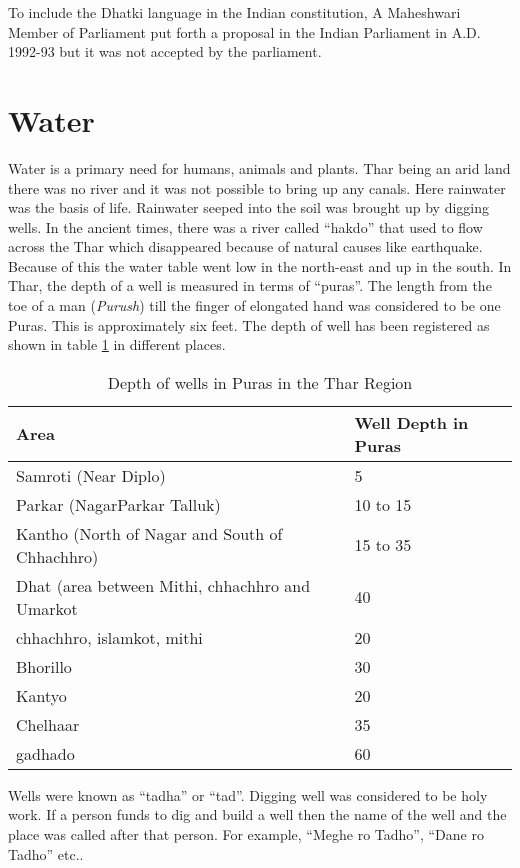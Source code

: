 To include the Dhatki language in the Indian constitution, A Maheshwari Member
of Parliament put forth a proposal in the Indian Parliament in A.D. 1992-93 but
it was not accepted by the parliament.

\section{Water}
Water is a primary need for humans, animals and plants. Thar being an arid land
there was no river and it was not possible to bring up any canals. Here
rainwater was the basis of life. Rainwater seeped into the soil was brought up
by digging wells. In the ancient times, there was a river called ``hakdo'' that
used to flow across the Thar which disappeared because of natural causes like
earthquake. Because of this the water table went low in the north-east and up in
the south. In Thar, the depth of a well is measured in terms of ``puras''. The
length from the toe of a man (\textit{Purush}) till the finger of elongated hand was
considered to be one Puras. This is approximately six feet. The depth of well
has been registered as shown in table \ref{tbl:well} in different places.
\begin{table}
\begin{center}
\begin{tabular}{l|l}
\hline
\textbf{Area} & \textbf{Well Depth in Puras} \\
\hline
Samroti (Near Diplo) & 5 \\ 
Parkar (NagarParkar Talluk) & 10 to 15 \\ 
Kantho (North of Nagar and South of Chhachhro) & 15 to 35 \\ 
Dhat (area between Mithi, chhachhro and Umarkot & 40 \\ 
chhachhro, islamkot, mithi & 20 \\ 
Bhorillo & 30 \\ 
Kantyo & 20 \\ 
Chelhaar & 35 \\ 
gadhado & 60 \\ 
\hline
\end{tabular}
\end{center}
\caption{Depth of wells in Puras in the Thar Region}
\label{tbl:well}
\end{table}

Wells were known as ``tadha'' or ``tad''. Digging well was considered to be holy
work. If a person funds to dig and build a well then the name of the well and
the place was called after that person. For example, ``Meghe ro Tadho'', ``Dane
ro Tadho'' etc..

